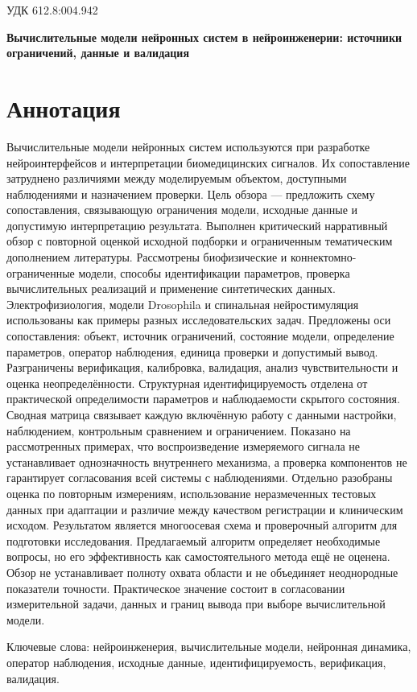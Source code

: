 \documentclass[12pt,a4paper]{article}
\begin{document}
\noindent УДК 612.8:004.942\par
\begin{center}\bfseries\fontsize{14}{17}\selectfont Вычислительные модели нейронных систем в нейроинженерии: источники ограничений, данные и валидация\end{center}
\section*{Аннотация}
Вычислительные модели нейронных систем используются при разработке нейроинтерфейсов и интерпретации биомедицинских сигналов. Их сопоставление затруднено различиями между моделируемым объектом, доступными наблюдениями и назначением проверки. Цель обзора — предложить схему сопоставления, связывающую ограничения модели, исходные данные и допустимую интерпретацию результата. Выполнен критический нарративный обзор с повторной оценкой исходной подборки и ограниченным тематическим дополнением литературы. Рассмотрены биофизические и коннектомно-ограниченные модели, способы идентификации параметров, проверка вычислительных реализаций и применение синтетических данных. Электрофизиология, модели Drosophila и спинальная нейростимуляция использованы как примеры разных исследовательских задач. Предложены оси сопоставления: объект, источник ограничений, состояние модели, определение параметров, оператор наблюдения, единица проверки и допустимый вывод. Разграничены верификация, калибровка, валидация, анализ чувствительности и оценка неопределённости. Структурная идентифицируемость отделена от практической определимости параметров и наблюдаемости скрытого состояния. Сводная матрица связывает каждую включённую работу с данными настройки, наблюдением, контрольным сравнением и ограничением. Показано на рассмотренных примерах, что воспроизведение измеряемого сигнала не устанавливает однозначность внутреннего механизма, а проверка компонентов не гарантирует согласования всей системы с наблюдениями. Отдельно разобраны оценка по повторным измерениям, использование неразмеченных тестовых данных при адаптации и различие между качеством регистрации и клиническим исходом. Результатом является многоосевая схема и проверочный алгоритм для подготовки исследования. Предлагаемый алгоритм определяет необходимые вопросы, но его эффективность как самостоятельного метода ещё не оценена. Обзор не устанавливает полноту охвата области и не объединяет неоднородные показатели точности. Практическое значение состоит в согласовании измерительной задачи, данных и границ вывода при выборе вычислительной модели.\par
\noindent\begin{minipage}{\linewidth}Ключевые слова: нейроинженерия, вычислительные модели, нейронная динамика, оператор наблюдения, исходные данные, идентифицируемость, верификация, валидация.\end{minipage}\par
\end{document}
